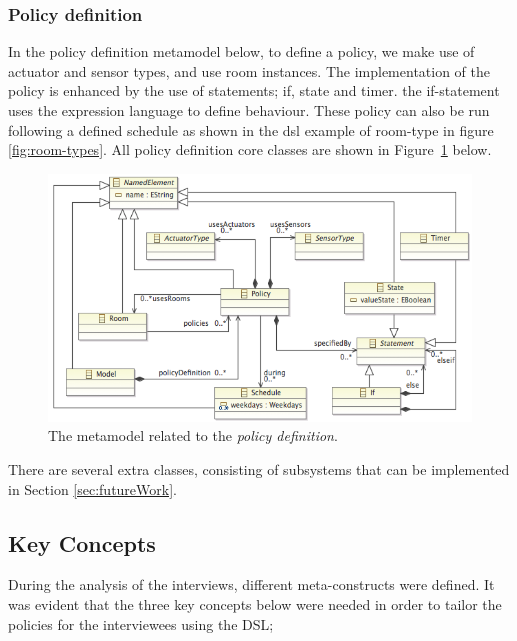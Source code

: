\subsubsection{Policy definition}
In the policy definition metamodel below, to define a policy, we make use of actuator and sensor types, and use room instances. The implementation of the policy is enhanced by the use of statements; if, state and timer. the if-statement uses the expression language to define behaviour. These policy can also be run following a defined schedule as shown in the dsl example of room-type in figure \ref{fig:room-types}. All policy definition core classes are shown in Figure \ref{fig:ecore-policy-definition} below.
\begin{figure}[h]
  \centering
    \includegraphics[scale=.5]{ecore-policy-definition.png}	
	\caption{The metamodel related to the \textit{policy definition}.}
	\label{fig:ecore-policy-definition}
\end{figure}

There are several extra classes, consisting of subsystems that can be implemented in Section \ref{sec:futureWork}.

\subsection{Key Concepts}

During the analysis of the interviews, different meta-constructs were defined. It was evident that the three key concepts below were needed in order to tailor the policies for the interviewees using the DSL;

